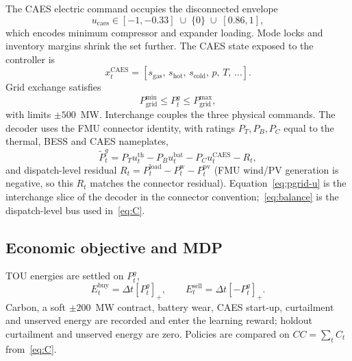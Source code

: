 \documentclass[conference]{IEEEtran}
\begin{document}
The CAES electric command occupies the disconnected envelope
\begin{equation}
u_{\mathrm{caes}}
\in
[-1,-0.33]\;\cup\;\{0\}\;\cup\;[0.86,1],
\label{eq:legal}
\end{equation}
which encodes minimum compressor and expander loading. Mode locks and inventory margins shrink the set further. The CAES state exposed to the controller is
\begin{equation}
x_t^{\mathrm{CAES}}
=
[s_{\mathrm{gas}},\,s_{\mathrm{hot}},\,s_{\mathrm{cold}},\,p,\,T,\,\ldots].
\label{eq:caes-x}
\end{equation}
Grid exchange satisfies
\begin{equation}
P_{\mathrm{grid}}^{\min}\le P_t^{g}\le P_{\mathrm{grid}}^{\max},
\label{eq:grid}
\end{equation}
with limits \(\pm500\)~MW. Interchange couples the three physical commands. The decoder uses the FMU connector identity, with ratings \(P_T,P_B,P_C\) equal to the thermal, BESS and CAES nameplates,
\begin{equation}
\tilde P_t^{g}
=
P_T u_t^{\mathrm{th}}
-
P_B u_t^{\mathrm{bat}}
-
P_C u_t^{\mathrm{CAES}}
-
R_t,
\label{eq:pgrid-u}
\end{equation}
and dispatch-level residual \(R_t=P_t^{\mathrm{load}}-P_t^{\mathrm{w}}-P_t^{\mathrm{pv}}\) (FMU wind/PV generation is negative, so this \(R_t\) matches the connector residual). Equation~\eqref{eq:pgrid-u} is the interchange slice of the decoder in the connector convention;~\eqref{eq:balance} is the dispatch-level bus used in~\eqref{eq:C}.

\subsection{Economic objective and MDP}
\label{sec:mdp}

TOU energies are settled on \(P_t^{g}\),
\begin{equation}
E_t^{\mathrm{buy}}=\Delta t[P_t^{g}]_+,\qquad
E_t^{\mathrm{sell}}=\Delta t[-P_t^{g}]_+.
\label{eq:tou-energy}
\end{equation}
Carbon, a soft \(\pm200\)~MW contract, battery wear, CAES start-up, curtailment and unserved energy are recorded and enter the learning reward; holdout curtailment and unserved energy are zero. Policies are compared on \(CC=\sum_t C_t\) from~\eqref{eq:C}.
\end{document}
